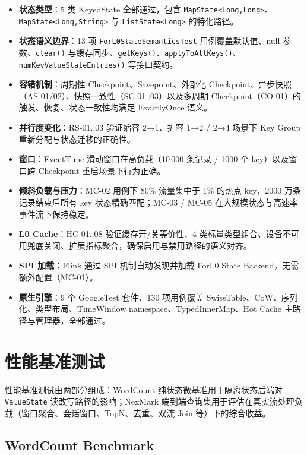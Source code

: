 \documentclass[a4paper,11pt]{article}
\newcommand{\project}{ForL0 State Backend}
\begin{document}
\begin{itemize}
  \item \textbf{状态类型}：5 类 KeyedState 全部通过，包含 \texttt{MapState<Long,Long>}、\texttt{MapState<Long,String>} 与 \texttt{ListState<Long>} 的特化路径。
  \item \textbf{状态语义边界}：13 项 \texttt{ForL0StateSemanticsTest} 用例覆盖默认值、null 参数、\texttt{clear()} 与缓存同步、\texttt{getKeys()}、\texttt{applyToAllKeys()}、\texttt{numKeyValueStateEntries()} 等接口契约。
  \item \textbf{容错机制}：周期性 Checkpoint、Savepoint、外部化 Checkpoint、异步快照（AS-01/02）、快照一致性（SC-01..03）以及多周期 Checkpoint（CO-01）的触发、恢复、状态一致性均满足 ExactlyOnce 语义。
  \item \textbf{并行度变化}：RS-01..03 验证缩容 2→1、扩容 1→2 / 2→4 场景下 Key Group 重新分配与状态迁移的正确性。
  \item \textbf{窗口}：EventTime 滑动窗口在高负载（10\,000 条记录 / 1000 个 key）以及窗口跨 Checkpoint 重启场景下行为正确。
  \item \textbf{倾斜负载与压力}：MC-02 用例下 80\% 流量集中于 1\% 的热点 key，2000 万条记录结束后所有 key 状态精确匹配；MC-03 / MC-05 在大规模状态与高速率事件流下保持稳定。
  \item \textbf{L0 Cache}：HC-01..08 验证缓存开/关等价性、4 类标量类型组合、设备不可用兜底关闭、扩展指标聚合，确保启用与禁用路径的语义对齐。
  \item \textbf{SPI 加载}：Flink 通过 SPI 机制自动发现并加载 \project{}，无需额外配置（MC-01）。
  \item \textbf{原生引擎}：9 个 GoogleTest 套件、130 项用例覆盖 SwissTable、CoW、序列化、类型布局、TimeWindow namespace、TypedInnerMap、Hot Cache 主路径与管理器，全部通过。
\end{itemize}

\section{性能基准测试}

性能基准测试由两部分组成：WordCount 纯状态微基准用于隔离状态后端对 \texttt{ValueState} 读改写路径的影响；NexMark 端到端查询集用于评估在真实流处理负载（窗口聚合、会话窗口、TopN、去重、双流 Join 等）下的综合收益。

\subsection{WordCount Benchmark}
\end{document}
